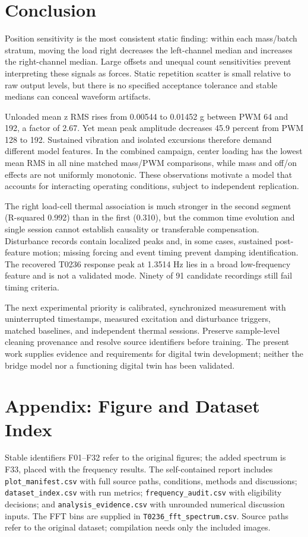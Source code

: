 \documentclass[10pt,letterpaper]{article}
\begin{document}
\section{Conclusion}
Position sensitivity is the most consistent static finding: within each mass/batch stratum, moving the load right decreases the left-channel median and increases the right-channel median. Large offsets and unequal count sensitivities prevent interpreting these signals as forces. Static repetition scatter is small relative to raw output levels, but there is no specified acceptance tolerance and stable medians can conceal waveform artifacts.

Unloaded mean z RMS rises from 0.00544 to 0.01452 g between PWM 64 and 192, a factor of 2.67. Yet mean peak amplitude decreases 45.9 percent from PWM 128 to 192. Sustained vibration and isolated excursions therefore demand different model features. In the combined campaign, center loading has the lowest mean RMS in all nine matched mass/PWM comparisons, while mass and off/on effects are not uniformly monotonic. These observations motivate a model that accounts for interacting operating conditions, subject to independent replication.

The right load-cell thermal association is much stronger in the second segment (R-squared 0.992) than in the first (0.310), but the common time evolution and single session cannot establish causality or transferable compensation. Disturbance records contain localized peaks and, in some cases, sustained post-feature motion; missing forcing and event timing prevent damping identification. The recovered T0236 response peak at 1.3514 Hz lies in a broad low-frequency feature and is not a validated mode. Ninety of 91 candidate recordings still fail timing criteria.

The next experimental priority is calibrated, synchronized measurement with uninterrupted timestamps, measured excitation and disturbance triggers, matched baselines, and independent thermal sessions. Preserve sample-level cleaning provenance and resolve source identifiers before training. The present work supplies evidence and requirements for digital twin development; neither the bridge model nor a functioning digital twin has been validated.

\clearpage\section{Appendix: Figure and Dataset Index}
Stable identifiers F01--F32 refer to the original figures; the added spectrum is F33, placed with the frequency results. The self-contained report includes \texttt{plot\_manifest.csv} with full source paths, conditions, methods and discussions; \texttt{dataset\_index.csv} with run metrics; \texttt{frequency\_audit.csv} with eligibility decisions; and \texttt{analysis\_evidence.csv} with unrounded numerical discussion inputs. The FFT bins are supplied in \texttt{T0236\_fft\_spectrum.csv}. Source paths refer to the original dataset; compilation needs only the included images.
\end{document}
